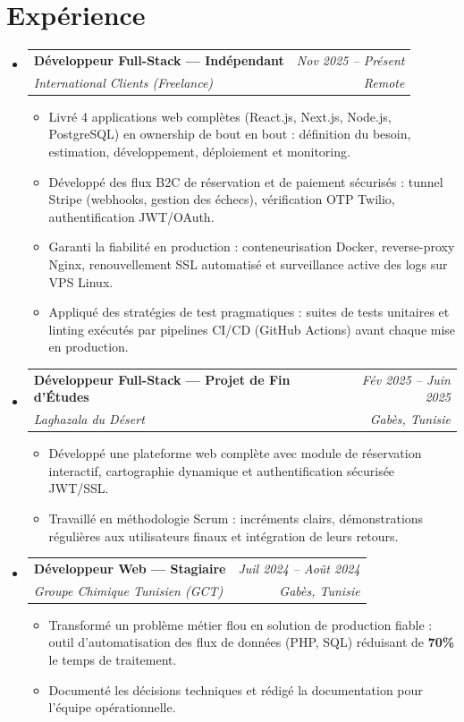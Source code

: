 \documentclass[letterpaper,9pt]{article}
\makeatletter
\newcommand{\resumeItem}[1]{\item\small{#1}}
\newcommand{\resumeSubheading}[4]{
  \vspace{-1pt}\item
  \begin{tabular*}{0.97\textwidth}[t]{l@{\extracolsep{\fill}}r}
    \textbf{#1} & \textit{\color{greytext}#2} \\
    \textit{\small\color{greytext} #3} & \textit{\small\color{greytext} #4}
  \end{tabular*}\vspace{-2pt}
}
\newcommand{\resumeSubHeadingListStart}{\begin{itemize}[leftmargin=0.18in, label={}, itemsep=1.2pt, topsep=2.5pt, parsep=0pt]}
\newcommand{\resumeSubHeadingListEnd}{\end{itemize}\vspace{-2pt}}
\newcommand{\resumeItemListStart}{\begin{itemize}[leftmargin=0.24in, label={}, itemsep=0.9pt, topsep=1.2pt, parsep=0pt]}
\newcommand{\resumeItemListEnd}{\end{itemize}\vspace{-2pt}}
\makeatother
\begin{document}
\section{Expérience}
\resumeSubHeadingListStart

  \resumeSubheading{Développeur Full-Stack --- Indépendant}{Nov 2025 -- Présent}{International Clients (Freelance)}{Remote}
    \resumeItemListStart
      \resumeItem{Livré 4 applications web complètes (React.js, Next.js, Node.js, PostgreSQL) en ownership de bout en bout : définition du besoin, estimation, développement, déploiement et monitoring.}
      \resumeItem{Développé des flux B2C de réservation et de paiement sécurisés : tunnel Stripe (webhooks, gestion des échecs), vérification OTP Twilio, authentification JWT/OAuth.}
      \resumeItem{Garanti la fiabilité en production : conteneurisation Docker, reverse-proxy Nginx, renouvellement SSL automatisé et surveillance active des logs sur VPS Linux.}
      \resumeItem{Appliqué des stratégies de test pragmatiques : suites de tests unitaires et linting exécutés par pipelines CI/CD (GitHub Actions) avant chaque mise en production.}
    \resumeItemListEnd

  \resumeSubheading{Développeur Full-Stack --- Projet de Fin d'Études}{Fév 2025 -- Juin 2025}{Laghazala du Désert}{Gabès, Tunisie}
    \resumeItemListStart
      \resumeItem{Développé une plateforme web complète avec module de réservation interactif, cartographie dynamique et authentification sécurisée JWT/SSL.}
      \resumeItem{Travaillé en méthodologie Scrum : incréments clairs, démonstrations régulières aux utilisateurs finaux et intégration de leurs retours.}
    \resumeItemListEnd

  \resumeSubheading{Développeur Web --- Stagiaire}{Juil 2024 -- Août 2024}{Groupe Chimique Tunisien (GCT)}{Gabès, Tunisie}
    \resumeItemListStart
      \resumeItem{Transformé un problème métier flou en solution de production fiable : outil d'automatisation des flux de données (PHP, SQL) réduisant de \textbf{70\%} le temps de traitement.}
      \resumeItem{Documenté les décisions techniques et rédigé la documentation pour l'équipe opérationnelle.}
    \resumeItemListEnd

\resumeSubHeadingListEnd\vspace{-2pt}

\end{document}
